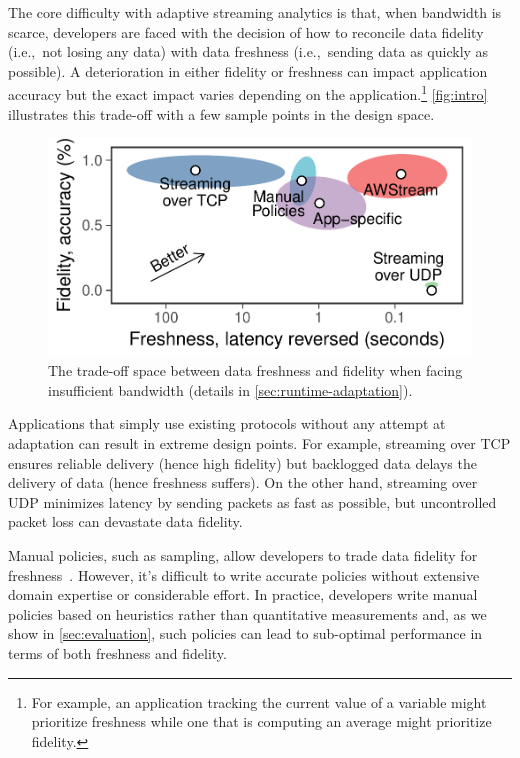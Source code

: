 The core difficulty with adaptive streaming analytics is that, when bandwidth is
scarce, developers are faced with the decision of how to reconcile data fidelity
(i.e.,~not losing any data) with data freshness (i.e.,~sending data as quickly
as possible). A deterioration in either fidelity or freshness can impact
application accuracy but the exact impact varies depending on the
application.\footnote{For example, an application tracking the current value of
  a variable might prioritize freshness while one that is computing an average
  might prioritize fidelity.} \autoref{fig:intro} illustrates this trade-off
with a few sample points in the design space.

\begin{figure}
  \centering
  \includegraphics[width=0.8\columnwidth]{figures/figure1.pdf}
  \caption{The trade-off space between data freshness and fidelity when facing
    insufficient bandwidth (details in \autoref{sec:runtime-adaptation}).}
  \label{fig:intro}
  \vspace{-1em}
\end{figure}

Applications that simply use existing protocols without any attempt at
adaptation can result in extreme design points. For example, streaming over TCP
ensures reliable delivery (hence high fidelity) but backlogged data delays the
delivery of data (hence freshness suffers).  On the other hand, streaming over
UDP minimizes latency by sending packets as fast as possible, but uncontrolled
packet loss can devastate data fidelity.

Manual policies, such as sampling, allow developers to trade data fidelity for
freshness~\cite{rabkin2014aggregation}. However, it's difficult to write
accurate policies without extensive domain expertise or considerable effort. In
practice, developers write manual policies based on heuristics rather than
quantitative measurements and, as we show in \autoref{sec:evaluation}, such
policies can lead to sub-optimal performance in terms of both freshness and
fidelity.

